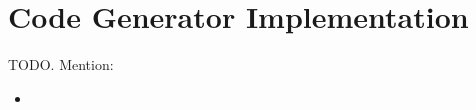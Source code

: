 \section{Code Generator Implementation} %
\label{sec:code_generator_implementation}
TODO. Mention:
\begin{itemize}
	\item 
\end{itemize}

